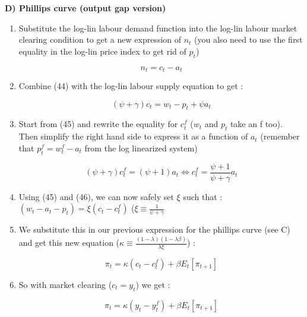 \documentclass{article}
\begin{document}
\textbf{D) Phillips curve (output gap version)}
\begin{enumerate}
    \item Substitute the log-lin labour demand function into the log-lin labour market clearing condition to get a new expression of $n_t$ (you also need to use the first equality in the log-lin price index to get rid of $p_t$)
    \begin{expectedresultsbox}
    \begin{equation}
        n_t=c_t-a_t
    \end{equation}
    \end{expectedresultsbox}
    \item Combine (44) with the log-lin labour supply equation to get : 
    \begin{expectedresultsbox}
    \begin{equation}
        (\psi + \gamma)c_t=w_t-p_t+\psi a_t
    \end{equation}
    \end{expectedresultsbox}
    \item Start from (45) and rewrite the equality for $c_t^f$ ($w_t$ and $p_t$ take an f too). Then simplify the right hand side to express it as a function of $a_t$ (remember that $p_t^f = w_t^f-a_t$ from the log linearized system)
    \begin{expectedresultsbox}
    \begin{equation}
        (\psi+\gamma)c_t^f = (\psi + 1)a_t \Longleftrightarrow c_t^f = \frac{\psi+1}{\psi + \gamma}a_t
    \end{equation}
    \end{expectedresultsbox}
    \item Using (45) and (46), we can now safely set $\xi$ such that : $(w_t-a_t-p_t) = \xi (c_t-c_t^f)$ ($\xi \equiv \frac{1}{\psi+\gamma}$
    \item We substitute this in our previous expression for the phillips curve (see C) and get this new equation ($\kappa\equiv \frac{(1-\lambda)(1-\lambda\beta)}{\lambda\xi}$) : 
    \begin{expectedresultsbox}
    \begin{equation}
        \pi_t = \kappa(c_t-c_t^f)+\beta E_t[\pi_{t+1}]
    \end{equation}   
    \end{expectedresultsbox}
    \item So with market clearing ($c_t = y_t$) we get : 
    \begin{expectedresultsbox}
    \begin{equation}
        \pi_t = \kappa(y_t-y_t^f)+\beta E_t[\pi_{t+1}]
    \end{equation}
    \end{expectedresultsbox}


\end{enumerate}
\end{document}
